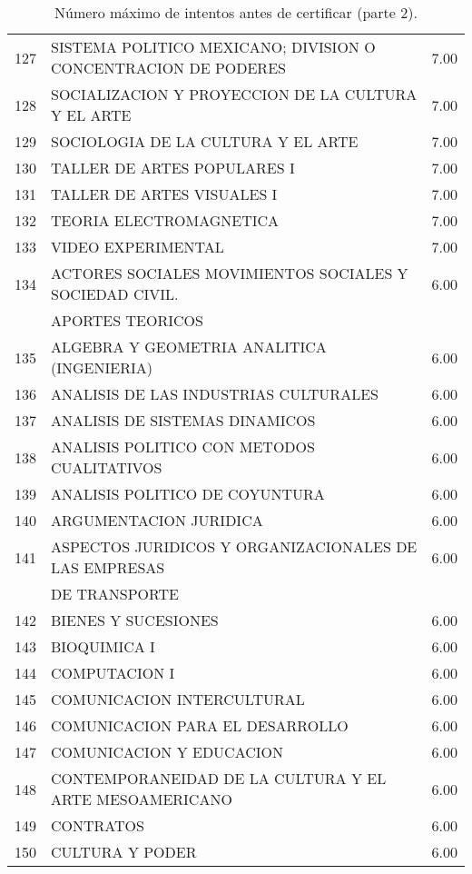 \documentclass[12pt]{article}
\begin{document}
\begin{table}[ht]
{\begin{tabular}{rlr}
  127 & SISTEMA POLITICO MEXICANO; DIVISION O CONCENTRACION DE PODERES & 7.00 \\ 
  128 & SOCIALIZACION Y PROYECCION DE LA CULTURA Y EL ARTE & 7.00 \\ 
  129 & SOCIOLOGIA DE LA CULTURA Y EL ARTE & 7.00 \\ 
  130 & TALLER DE ARTES POPULARES I & 7.00 \\ 
  131 & TALLER DE ARTES VISUALES I & 7.00 \\ 
  132 & TEORIA ELECTROMAGNETICA & 7.00 \\ 
  133 & VIDEO EXPERIMENTAL & 7.00 \\ 
  134 & ACTORES SOCIALES MOVIMIENTOS SOCIALES Y SOCIEDAD CIVIL. & 6.00 \\ 
  &  APORTES TEORICOS &  \\ 
  135 & ALGEBRA Y GEOMETRIA ANALITICA (INGENIERIA) & 6.00 \\ 
  136 & ANALISIS DE LAS INDUSTRIAS CULTURALES & 6.00 \\ 
  137 & ANALISIS DE SISTEMAS DINAMICOS & 6.00 \\ 
  138 & ANALISIS POLITICO CON METODOS CUALITATIVOS & 6.00 \\ 
  139 & ANALISIS POLITICO DE COYUNTURA & 6.00 \\ 
  140 & ARGUMENTACION JURIDICA & 6.00 \\ 
  141 & ASPECTOS JURIDICOS Y ORGANIZACIONALES DE LAS EMPRESAS& 6.00 \\ 
   & DE TRANSPORTE & \\ 
  142 & BIENES Y SUCESIONES & 6.00 \\ 
  143 & BIOQUIMICA I & 6.00 \\ 
  144 & COMPUTACION I & 6.00 \\ 
  145 & COMUNICACION INTERCULTURAL & 6.00 \\ 
  146 & COMUNICACION PARA EL DESARROLLO & 6.00 \\ 
  147 & COMUNICACION Y EDUCACION & 6.00 \\ 
  148 & CONTEMPORANEIDAD DE LA CULTURA Y EL ARTE MESOAMERICANO & 6.00 \\ 
  149 & CONTRATOS & 6.00 \\ 
  150 & CULTURA Y PODER & 6.00 \\ 
   \hline
\end{tabular}}
\caption{\label{Num_Max_Intentos_Cert_2} N\'umero m\'aximo de intentos antes de certificar (parte 2).}
\end{table}
\end{document}
